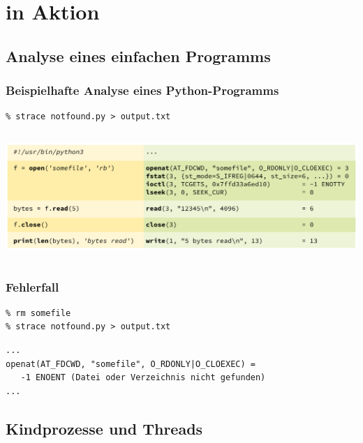 \section{\strace{} in Aktion}

\subsection{Analyse eines einfachen Programms}

\begin{frame}[t,fragile]
  \frametitle{Beispielhafte Analyse eines Python-Programms}

  \begin{lstlisting}
% strace notfound.py > output.txt
  \end{lstlisting}

  \centering
  \begin{columns}
    \column{\dimexpr\paperwidth}
    \includegraphics[width=\paperwidth]{../images/sample-listing.pdf}
  \end{columns}

\end{frame}

\begin{frame}[fragile]
  \frametitle{Fehlerfall}

  \begin{lstlisting}
% rm somefile
% strace notfound.py > output.txt
  \end{lstlisting}

  \begin{exampleblock}{\vspace*{-2ex}}
  \begin{lstlisting}
...
openat(AT_FDCWD, "somefile", O_RDONLY|O_CLOEXEC) =
   -1 ENOENT (Datei oder Verzeichnis nicht gefunden)
...
  \end{lstlisting}
  \end{exampleblock}


\end{frame}

\subsection{Kindprozesse und Threads}

